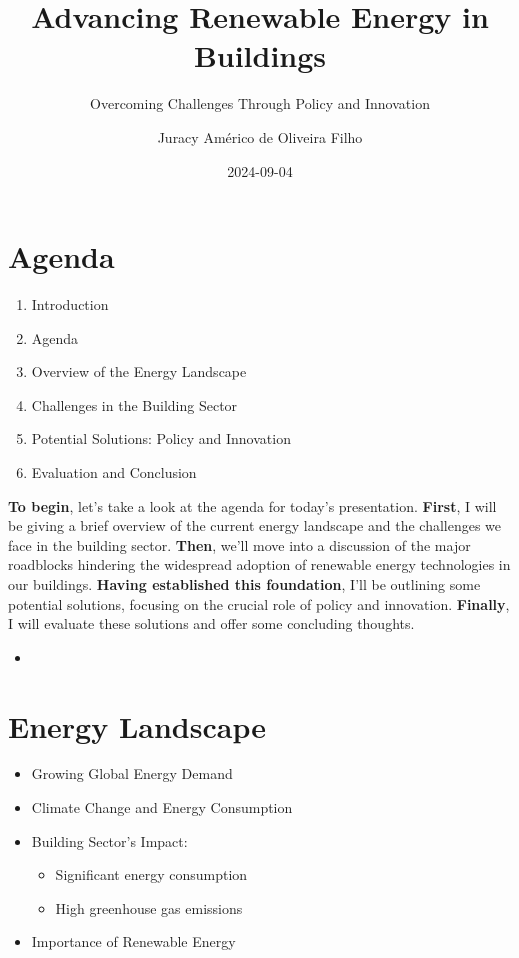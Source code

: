 \documentclass[
  letterpaper,
  DIV=11,
  numbers=noendperiod]{scrartcl}
\title{Advancing Renewable Energy in Buildings}
\subtitle{Overcoming Challenges Through Policy and Innovation}
\author{Juracy Américo de Oliveira Filho}
\date{2024-09-04}
\providecommand{\tightlist}{%
  \setlength{\itemsep}{0pt}\setlength{\parskip}{0pt}}\usepackage{longtable,booktabs,array}
\begin{document}
\maketitle


\section{Agenda}\label{agenda}

\begin{enumerate}
\def\labelenumi{\arabic{enumi})}
\tightlist
\item
  Introduction\\
\item
  Agenda
\item
  Overview of the Energy Landscape
\item
  Challenges in the Building Sector
\item
  Potential Solutions: Policy and Innovation
\item
  Evaluation and Conclusion
\end{enumerate}

\textbf{To begin}, let's take a look at the agenda for today's
presentation. \textbf{First}, I will be giving a brief overview of the
current energy landscape and the challenges we face in the building
sector. \textbf{Then}, we'll move into a discussion of the major
roadblocks hindering the widespread adoption of renewable energy
technologies in our buildings. \textbf{Having established this
foundation}, I'll be outlining some potential solutions, focusing on the
crucial role of policy and innovation. \textbf{Finally}, I will evaluate
these solutions and offer some concluding thoughts.

\begin{itemize}
\tightlist
\item
\end{itemize}

\section{Energy Landscape}\label{energy-landscape}

\begin{itemize}
\tightlist
\item
  Growing Global Energy Demand
\item
  Climate Change and Energy Consumption
\item
  Building Sector's Impact:

  \begin{itemize}
  \tightlist
  \item
    Significant energy consumption
  \item
    High greenhouse gas emissions
  \end{itemize}
\item
  Importance of Renewable Energy
\end{itemize}
\end{document}
